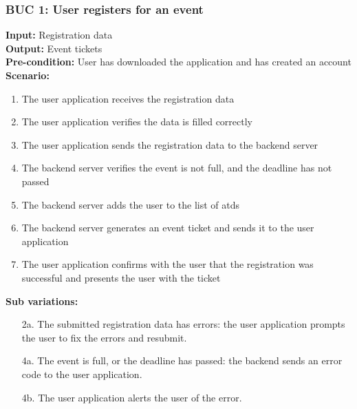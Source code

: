 \documentclass[12pt]{article}
\begin{document}
\subsubsection*{BUC 1: User registers for an event}
\textbf{Input:} Registration data \\
\textbf{Output:} Event tickets \\
\textbf{Pre-condition:} User has downloaded the application and has created an account \\
\textbf{Scenario:}
\begin{enumerate}
  \item The user application receives the registration data
  \item The user application verifies the data is filled correctly
  \item The user application sends the registration data to the backend server
  \item The backend server verifies the event is not full, and the deadline has not passed
  \item The backend server adds the user to the list of \glspl{atd}
  \item The backend server generates an event ticket and sends it to the user application
  \item The user application confirms with the user that the registration was successful and presents the user with the
    ticket
\end{enumerate}
\textbf{Sub variations:}
\begin{itemize}
  \item [2a.] The submitted registration data has errors: the user application prompts the user to fix the errors and resubmit.
  \item [4a.] The event is full, or the deadline has passed: the backend sends an error code to the user application.
  \item [4b.] The user application alerts the user of the error.
\end{itemize}
\end{document}
